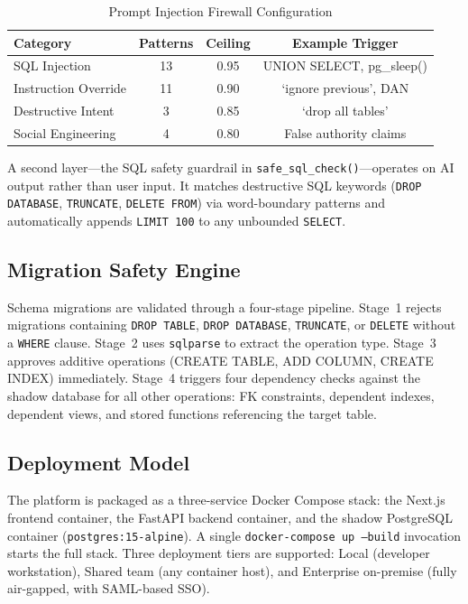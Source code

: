 \documentclass[12pt,a4paper]{report}
\begin{document}
\begin{table}[htbp]
\caption{Prompt Injection Firewall Configuration}
\label{tab:firewall}
\centering
\begin{tabular}{lccc}
\toprule
\textbf{Category} & \textbf{Patterns} & \textbf{Ceiling} & \textbf{Example Trigger} \\
\midrule
SQL Injection      & 13 & 0.95 & UNION SELECT, pg\_sleep() \\
Instruction Override & 11 & 0.90 & `ignore previous', DAN \\
Destructive Intent & 3  & 0.85 & `drop all tables' \\
Social Engineering & 4  & 0.80 & False authority claims \\
\bottomrule
\end{tabular}
\end{table}

A second layer---the SQL safety guardrail in \texttt{safe\_sql\_check()}---operates on AI output rather than user input. It matches destructive SQL keywords (\texttt{DROP DATABASE}, \texttt{TRUNCATE}, \texttt{DELETE FROM}) via word-boundary patterns and automatically appends \texttt{LIMIT 100} to any unbounded \texttt{SELECT}.

\subsection{Migration Safety Engine}

Schema migrations are validated through a four-stage pipeline. Stage~1 rejects migrations containing \texttt{DROP TABLE}, \texttt{DROP DATABASE}, \texttt{TRUNCATE}, or \texttt{DELETE} without a \texttt{WHERE} clause. Stage~2 uses \texttt{sqlparse} to extract the operation type. Stage~3 approves additive operations (CREATE TABLE, ADD COLUMN, CREATE INDEX) immediately. Stage~4 triggers four dependency checks against the shadow database for all other operations: FK constraints, dependent indexes, dependent views, and stored functions referencing the target table.

\subsection{Deployment Model}

The platform is packaged as a three-service Docker Compose stack: the Next.js frontend container, the FastAPI backend container, and the shadow PostgreSQL container (\texttt{postgres:15-alpine}). A single \texttt{docker-compose up --build} invocation starts the full stack. Three deployment tiers are supported: Local (developer workstation), Shared team (any container host), and Enterprise on-premise (fully air-gapped, with SAML-based SSO).
\end{document}
